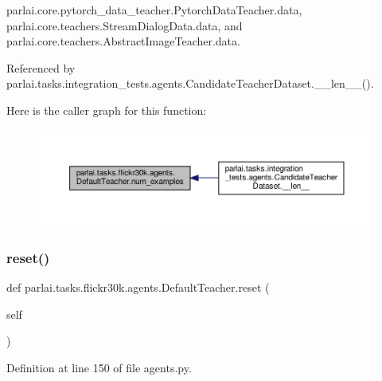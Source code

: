 parlai.\+core.\+pytorch\+\_\+data\+\_\+teacher.\+Pytorch\+Data\+Teacher.\+data, parlai.\+core.\+teachers.\+Stream\+Dialog\+Data.\+data, and parlai.\+core.\+teachers.\+Abstract\+Image\+Teacher.\+data.



Referenced by parlai.\+tasks.\+integration\+\_\+tests.\+agents.\+Candidate\+Teacher\+Dataset.\+\_\+\+\_\+len\+\_\+\+\_\+().

Here is the caller graph for this function\+:
\nopagebreak
\begin{figure}[H]
\begin{center}
\leavevmode
\includegraphics[width=350pt]{classparlai_1_1tasks_1_1flickr30k_1_1agents_1_1DefaultTeacher_a58f86f4eb5a109d5c2a9034d701d452c_icgraph}
\end{center}
\end{figure}
\mbox{\label{classparlai_1_1tasks_1_1flickr30k_1_1agents_1_1DefaultTeacher_a19271160caed973aa96611d3898a6209}} 
\subsubsection{\texorpdfstring{reset()}{reset()}}
{\footnotesize\ttfamily def parlai.\+tasks.\+flickr30k.\+agents.\+Default\+Teacher.\+reset (\begin{DoxyParamCaption}\item[{}]{self }\end{DoxyParamCaption})}



Definition at line 150 of file agents.\+py.

\mbox{\label{classparlai_1_1tasks_1_1flickr30k_1_1agents_1_1DefaultTeacher_ae64406b518a24c25b8d4db2c614cafea}} 
